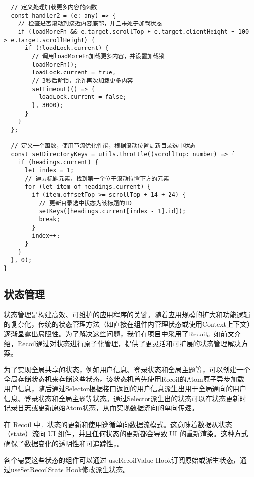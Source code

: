\documentclass[12pt,a4paper]{article}
\begin{document}
\begin{CJK*}{UTF8}{gbsn}
\begin{mdframed}
\begin{verbatim}
  // 定义处理加载更多内容的函数
  const handler2 = (e: any) => {
    // 检查是否滚动到接近内容底部，并且未处于加载状态
    if (loadMoreFn && e.target.scrollTop + e.target.clientHeight + 100 > e.target.scrollHeight) {
      if (!loadLock.current) {
        // 调用loadMoreFn加载更多内容，并设置加载锁
        loadMoreFn();
        loadLock.current = true;
        // 3秒后解锁，允许再次加载更多内容
        setTimeout(() => {
          loadLock.current = false;
        }, 3000);
      }
    }
  };

  // 定义一个函数，使用节流优化性能，根据滚动位置更新目录选中状态
  const setDirectoryKeys = utils.throttle((scrollTop: number) => {
    if (headings.current) {
      let index = 1;
      // 遍历标题元素，找到第一个位于滚动位置下方的元素
      for (let item of headings.current) {
        if (item.offsetTop >= scrollTop + 14 + 24) {
          // 更新目录选中状态为该标题的ID
          setKeys([headings.current[index - 1].id]);
          break;
        }
        index++;
      }
    }
  }, 0);
}

\end{verbatim}   
\end{mdframed}





\subsection{状态管理}
状态管理是构建高效、可维护的应用程序的关键。随着应用规模的扩大和功能逻辑的复杂化，传统的状态管理方法（如直接在组件内管理状态或使用Context上下文）逐渐显露出局限性。为了解决这些问题，我们在项目中采用了Recoil。如前文介绍，Recoil通过对状态进行原子化管理，提供了更灵活和可扩展的状态管理解决方案。

为了实现全局共享的状态，例如用户信息、登录状态和全局主题等，可以创建一个全局存储状态机来存储这些状态。该状态机首先使用Recoil的Atom原子异步加载用户信息，随后通过Selector根据接口返回的用户信息派生出用于全局通向的用户信息、登录状态和全局主题等状态。通过Selector派生出的状态可以在状态更新时记录日志或更新原始Atom状态，从而实现数据流向的单向传递。

在 Recoil 中，状态的更新和使用遵循单向数据流模式。这意味着数据从状态（state）流向 UI 组件，并且任何状态的更新都会导致 UI 的重新渲染。这种方式确保了数据变化的透明性和可追踪性，。

各个需要这些状态的组件可以通过 useRecoilValue Hook订阅原始或派生状态，通过useSetRecoilState Hook修改派生状态。


\end{CJK*}
\end{document}
